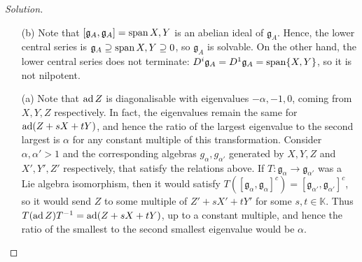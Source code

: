 \documentclass{report}
\begin{document}
\begin{proof}[Solution]
    \begin{enumerate}
        \item[(b)] Note that $[\mathfrak g_A, \mathfrak g_A] = \operatorname{span}{X,Y}$ is an abelian ideal of $\mathfrak{g}_A$.
        Hence, the lower central series is $\mathfrak g_A \supseteq \operatorname{span}{X,Y} \supseteq 0$, so $\mathfrak g_A$ is solvable.
        On the other hand, the lower central series does not terminate: $D^i\mathfrak g_A = D^1 \mathfrak g_A = \operatorname{span}\{X, Y\}$, so it is not nilpotent.
        \item[(a)] Note that $\operatorname{ad} Z$ is diagonalisable with eigenvalues $-\alpha, -1, 0$, coming from $X, Y, Z$ respectively.
        In fact, the eigenvalues remain the same for $\operatorname{ad}(Z + sX + tY)$, and hence the ratio of the largest eigenvalue to the second largest is $\alpha$ for any constant multiple of this transformation.
        Consider $\alpha, \alpha' > 1$ and the corresponding algebras $g_\alpha, g_{\alpha'}$ generated by $X,Y,Z$ and $X',Y',Z'$ respectively, that satisfy the relations above.
        If $T: \mathfrak g_\alpha \to \mathfrak g_{\alpha'}$ was a Lie algebra isomorphism, then it would satisfy $T([\mathfrak g_\alpha, \mathfrak g_\alpha]^c) = [\mathfrak g_{\alpha'}, \mathfrak g_{\alpha'}]^c$, so it would send $Z$ to some multiple of $Z' + sX' + tY'$ for some $s,t \in \mathbb K$.
        Thus $ T(\operatorname{ad} Z)T^{-1} = \operatorname{ad}(Z + sX + tY)$, up to a constant multiple, and hence the ratio of the smallest to the second smallest eigenvalue would be $\alpha$. 
    \end{enumerate}
\end{proof}
\end{document}
